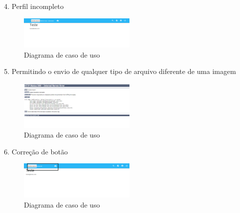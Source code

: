4. Perfil incompleto
\begin{figure}[ht]
	\centering
	\includegraphics[width=0.5\textwidth]{./imagens/perfil_desarrumado.png}
	\caption{Diagrama de caso de uso}
	\label{fig:casoDeUso}
\end{figure}

\pagebreak

5. Permitindo o envio de qualquer tipo de arquivo diferente de uma imagem
\begin{figure}[ht]
	\centering
	\includegraphics[width=0.5\textwidth]{./imagens/erro_envio.png}
	\caption{Diagrama de caso de uso}
	\label{fig:casoDeUso}
\end{figure}

\pagebreak

6. Correção de botão
\begin{figure}[ht]
	\centering
	\includegraphics[width=0.5\textwidth]{./imagens/envio_qualquer_arquivo.png}
	\caption{Diagrama de caso de uso}
	\label{fig:casoDeUso}
\end{figure}

\pagebreak


